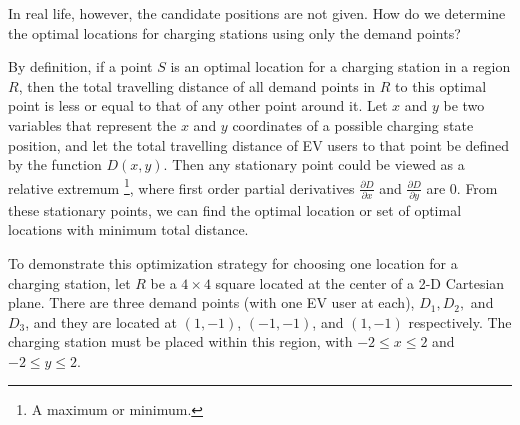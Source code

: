 \documentclass[10pt]{article}
\begin{document}
In real life, however, the candidate positions are not given. How do we determine the optimal locations for charging stations using only the demand points?

By definition, if a point $S$ is an optimal location for a charging station in a region $R$, then the total travelling distance of all demand points in $R$ to this optimal point is less or equal to that of any other point around it. Let $x$ and $y$ be two variables that represent the $x$ and $y$ coordinates of a possible charging state position, and let the total travelling distance of EV users to that point be defined by the function $D(x,y)$. Then any stationary point could be viewed as a relative extremum \footnote{A maximum or minimum.}, where first order partial derivatives $\frac{\partial D}{\partial x}$ and $\frac{\partial D}{\partial y}$ are 0. From these stationary points, we can find the optimal location or set of optimal locations with minimum total distance.

To demonstrate this optimization strategy for choosing one location for a charging station, let $R$ be a $4 \times 4$ square located at the center of a 2-D Cartesian plane. There are three demand points (with one EV user at each), $D_1, D_2,$ and $D_3$, and they are located at $(1,-1)$, $(-1,-1)$, and $(1,-1)$ respectively. The charging station must be placed within this region, with $-2 \le x \le 2$ and $-2 \le y \le 2$.
\end{document}

